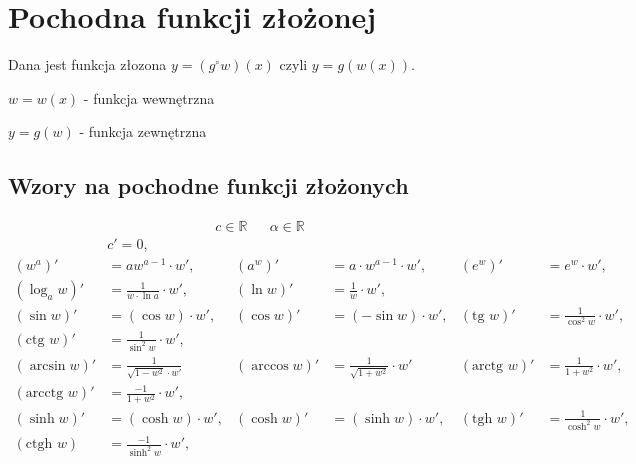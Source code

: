 \documentclass[11pt]{article}
\begin{document}
\section{Pochodna funkcji złożonej}
\label{sec:orgff80f60}
Dana jest funkcja złozona \(y = (g^\circ w)(x)\) czyli \(y = g(w(x))\).

\(w = w(x)\) - funkcja wewnętrzna

\(y = g(w)\) - funkcja zewnętrzna
\subsection{Wzory na pochodne funkcji złożonych}
\label{sec:org74f976d}
\begin{align*}
c \in \mathbb{R} && \alpha \in \mathbb{R}
\end{align*}
\begin{align*}
  & c' = 0,
  \\ \left(w^{a}\right)'&= a w^{a-1} \cdot w',
                        & \left(a^{w} \right)' &= a  \cdot w^{a-1} \cdot w',
                                               & \left( e^{w} \right)' &= e^{w} \cdot w',
  \\ \left(\log_{a}w \right)' &= \frac{1}{w \cdot \ln a} \cdot w',
                        & \left( \ln w \right)' &= \frac{1}{w} \cdot w',
  \\ \left( \sin w \right)' &= (\cos w) \cdot w',
                        & \left( \cos w \right)' &= (- \sin w) \cdot w',
                                               & \left( \text{tg } w \right)' &= \frac{1}{\cos^{2} w} \cdot w' ,
  \\ \left(\text{ctg } w \right)' &= \frac{1}{\sin^{2} w} \cdot w',
  \\  \left( \arcsin w \right)' &= \frac{1}{\sqrt{1-w^{2}} \cdot w'}
                        & \left(\arccos w \right)' &=\frac{1}{\sqrt{1+w^{2}}} \cdot w'
                                               & \left( \text{arctg } w \right)' &= \frac{1}{1+w^{2}} \cdot w',
  \\ \left( \text{arcctg } w \right)' &= \frac{-1}{1+w^{2}} \cdot w',
  \\  \left( \sinh w \right )' &=  (\cosh w) \cdot w' ,
                        & \left( \cosh w \right )' &= (\sinh w) \cdot w',
                                               & \left( \text{tgh } w \right )' &= \frac{1}{\cosh^{2} w} \cdot w',
  \\ \left( \text{ctgh } w \right ) &= \frac{-1}{\sinh ^{2} w} \cdot w',
\end{align*}
\end{document}
